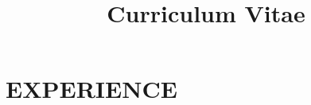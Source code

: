 \documentclass[10pt,a4paper,sans]{moderncv} %
\title{Curriculum Vitae}
\begin{document}
	
\makecvtitle






\section{EXPERIENCE}
\end{document}
